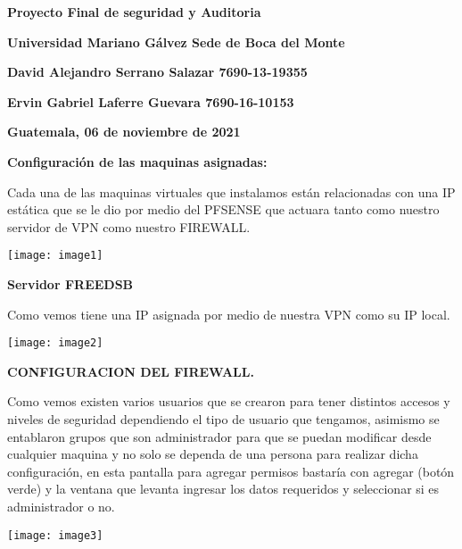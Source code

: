 \documentclass{book} %
\begin{document}


\noindent \textbf{Proyecto Final de seguridad y Auditoria}

\noindent \textbf{Universidad Mariano G\'{a}lvez Sede de Boca del Monte}

\noindent \textbf{David Alejandro Serrano Salazar 7690-13-19355}

\noindent \textbf{Ervin Gabriel Laferre Guevara 7690-16-10153}

\noindent \textbf{Guatemala, 06 de noviembre de 2021}

\noindent \textbf{}

\noindent \textbf{}

\noindent \textbf{Configuraci\'{o}n de las maquinas asignadas:}

\noindent 

\noindent Cada una de las maquinas virtuales que instalamos est\'{a}n relacionadas con una IP est\'{a}tica que se le dio por medio del PFSENSE que actuara tanto como nuestro servidor de VPN como nuestro FIREWALL.

\noindent 

\noindent \texttt{[image: image1]}

\noindent \textbf{Servidor FREEDSB}

\noindent Como vemos tiene una IP asignada por medio de nuestra VPN como su IP local.

\noindent 

\noindent \texttt{[image: image2]}

\noindent 

\noindent \textbf{CONFIGURACION DEL FIREWALL.}

\noindent Como vemos existen varios usuarios que se crearon para tener distintos accesos y niveles de seguridad dependiendo el tipo de usuario que tengamos, asimismo se entablaron grupos que son administrador para que se puedan modificar desde cualquier maquina y no solo se dependa de una persona para realizar dicha configuraci\'{o}n, en esta pantalla para agregar permisos bastar\'{i}a con agregar (bot\'{o}n verde) y la ventana que levanta ingresar los datos requeridos y seleccionar si es administrador o no.

\noindent 

\noindent \texttt{[image: image3]}

\noindent 
\end{document}
